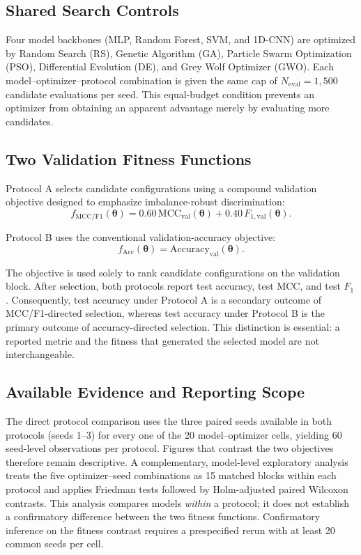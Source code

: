 \documentclass[sn-mathphys-num,Numbered]{sn-jnl}
\begin{document}
\subsection{Shared Search Controls}

Four model backbones (MLP, Random Forest, SVM, and 1D-CNN) are optimized by Random Search (RS), Genetic Algorithm (GA), Particle Swarm Optimization (PSO), Differential Evolution (DE), and Grey Wolf Optimizer (GWO). Each model--optimizer--protocol combination is given the same cap of $N_{\mathrm{eval}}=1{,}500$ candidate evaluations per seed. This equal-budget condition prevents an optimizer from obtaining an apparent advantage merely by evaluating more candidates.

\subsection{Two Validation Fitness Functions}

Protocol A selects candidate configurations using a compound validation objective designed to emphasize imbalance-robust discrimination:
\begin{equation}
f_{\mathrm{MCC/F1}}(\boldsymbol{\theta})=0.60\,\mathrm{MCC}_{\mathrm{val}}(\boldsymbol{\theta})+0.40\,F_{1,\mathrm{val}}(\boldsymbol{\theta}).
\end{equation}

Protocol B uses the conventional validation-accuracy objective:
\begin{equation}
f_{\mathrm{Acc}}(\boldsymbol{\theta})=\mathrm{Accuracy}_{\mathrm{val}}(\boldsymbol{\theta}).
\end{equation}

The objective is used solely to rank candidate configurations on the validation block. After selection, both protocols report test accuracy, test MCC, and test $F_1$. Consequently, test accuracy under Protocol A is a secondary outcome of MCC/F1-directed selection, whereas test accuracy under Protocol B is the primary outcome of accuracy-directed selection. This distinction is essential: a reported metric and the fitness that generated the selected model are not interchangeable.

\subsection{Available Evidence and Reporting Scope}

The direct protocol comparison uses the three paired seeds available in both protocols (seeds 1--3) for every one of the 20 model--optimizer cells, yielding 60 seed-level observations per protocol. Figures that contrast the two objectives therefore remain descriptive. A complementary, model-level exploratory analysis treats the five optimizer--seed combinations as 15 matched blocks within each protocol and applies Friedman tests followed by Holm-adjusted paired Wilcoxon contrasts. This analysis compares models \emph{within} a protocol; it does not establish a confirmatory difference between the two fitness functions. Confirmatory inference on the fitness contrast requires a prespecified rerun with at least 20 common seeds per cell.
\end{document}
